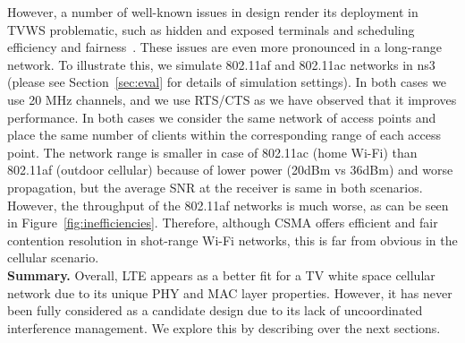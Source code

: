 However, a number of well-known issues in \wf design render its deployment in TVWS problematic, such as hidden and exposed terminals and scheduling efficiency and fairness~\cite{idle_sense}.
These issues are even more pronounced in a long-range network. To illustrate this, we simulate 802.11af and 802.11ac networks in ns3 (please see Section~\ref{sec:eval} for details of simulation settings). 
In both cases we use 20 MHz channels, and we use RTS/CTS as we have observed that it improves performance. 
In both cases we consider the same network of access points and place the same number of clients within the corresponding range of each access point. 
The network range is smaller in case of 802.11ac (home Wi-Fi) than 802.11af (outdoor cellular) because of lower power (20dBm vs 36dBm) and worse propagation, 
but the average SNR at the receiver is same in both scenarios. 
However, the throughput of the 802.11af networks is much worse, as can be seen in Figure~\ref{fig:inefficiencies}.
Therefore, although CSMA offers efficient and fair contention resolution in shot-range Wi-Fi networks, this is far from obvious in the cellular scenario. \\

{\bf Summary.} Overall, LTE appears as a better fit for a TV white space cellular network due to its unique PHY and MAC layer properties.
However, it has never been fully considered as a candidate design due to its lack of uncoordinated interference management. We explore this by describing \cf over the next sections.








